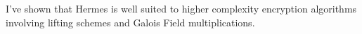 I've shown that Hermes is well suited to higher complexity encryption algorithms involving lifting schemes and Galois Field multiplications.

